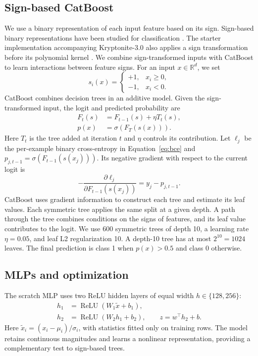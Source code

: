 \documentclass{article}
\begin{document}
\subsection{Sign-based CatBoost}
We use a binary representation of each input feature based on its sign. Sign-based binary representations have been studied for classification \cite{needell2018}. The starter implementation accompanying Kryptonite-3.0 also applies a sign transformation before its polynomial kernel \cite{quinn2026}. We combine sign-transformed inputs with CatBoost to learn interactions between feature signs. For an input $x\in\mathbb R^d$, we set
\begin{equation}
s_i(x)=\begin{cases}+1,&x_i\geq0,\\-1,&x_i<0.\end{cases}
\label{eq:sign}
\end{equation}
CatBoost \cite{prokhorenkova2018} combines decision trees in an additive model. Given the sign-transformed input, the logit and predicted probability are
\begin{align}
F_t(s)&=F_{t-1}(s)+\eta T_t(s),\nonumber\\
p(x)&=\sigma(F_T(s(x))).
\end{align}
Here $T_t$ is the tree added at iteration $t$ and $\eta$ controls its contribution. Let $\ell_j$ be the per-example binary cross-entropy in Equation~\ref{eq:bce} and $p_{j,t-1}=\sigma(F_{t-1}(s(x_j)))$. Its negative gradient with respect to the current logit is
\begin{equation}
-\frac{\partial\ell_j}{\partial F_{t-1}(s(x_j))}=y_j-p_{j,t-1}.
\end{equation}
CatBoost uses gradient information to construct each tree and estimate its leaf values. Each symmetric tree applies the same split at a given depth. A path through the tree combines conditions on the signs of features, and its leaf value contributes to the logit. We use 600 symmetric trees of depth 10, a learning rate $\eta=0.05$, and leaf L2 regularization 10. A depth-10 tree has at most $2^{10}=1024$ leaves. The final prediction is class 1 when $p(x)>0.5$ and class 0 otherwise.

\subsection{MLPs and optimization}
The scratch MLP uses two ReLU hidden layers of equal width $h\in\{128,256\}$:
\begin{align}
h_1&=\operatorname{ReLU}(W_1\tilde x+b_1),\nonumber\\
h_2&=\operatorname{ReLU}(W_2h_1+b_2),\qquad z=w^\top h_2+b.
\end{align}
Here $\tilde x_i=(x_i-\mu_i)/\sigma_i$, with statistics fitted only on training rows. The model retains continuous magnitudes and learns a nonlinear representation, providing a complementary test to sign-based trees.
\end{document}
